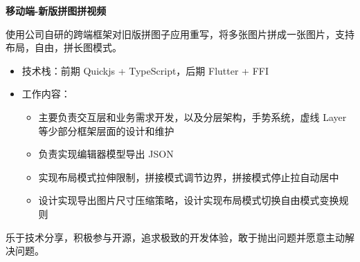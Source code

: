 \textbf{移动端-新版拼图拼视频}

\vspace{10pt}

使用公司自研的跨端框架对旧版拼图子应用重写，将多张图片拼成一张图片，支持布局，自由，拼长图模式。

\begin{itemize}
\item 技术栈：前期 Quickjs + TypeScript，后期 Flutter + FFI
\item 工作内容：
  \begin{itemize}
    \item 主要负责交互层和业务需求开发，以及分层架构，手势系统，虚线 Layer 等少部分框架层面的设计和维护
    \item 负责实现编辑器模型导出 JSON
    \item 实现布局模式拉伸限制，拼接模式调节边界，拼接模式停止拉自动居中
    \item 设计实现导出图片尺寸压缩策略，设计实现布局模式切换自由模式变换规则
  \end{itemize}
\end{itemize}


乐于技术分享，积极参与开源，追求极致的开发体验，敢于抛出问题并愿意主动解决问题。

